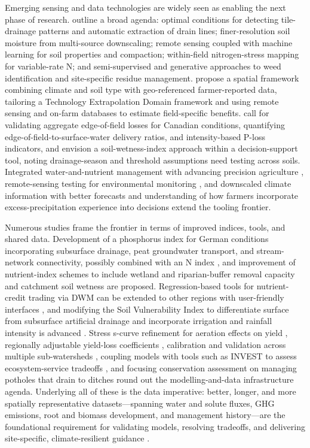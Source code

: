 Emerging sensing and data technologies are widely seen as enabling the next phase of research. \textcite{Khanal2020} outline a broad agenda: optimal conditions for detecting tile-drainage patterns and automatic extraction of drain lines; finer-resolution soil moisture from multi-source downscaling; remote sensing coupled with machine learning for soil properties and compaction; within-field nitrogen-stress mapping for variable-rate N; and semi-supervised and generative approaches to weed identification and site-specific residue management. \textcite{Cassman2025} propose a spatial framework combining climate and soil type with geo-referenced farmer-reported data, tailoring a Technology Extrapolation Domain framework and using remote sensing and on-farm databases to estimate field-specific benefits. \textcite{Reid2018} call for validating aggregate edge-of-field losses for Canadian conditions, quantifying edge-of-field-to-surface-water delivery ratios, and intensity-based P-loss indicators, and \textcite{Julien2023} envision a soil-wetness-index approach within a decision-support tool, noting drainage-season and threshold assumptions need testing across soils. Integrated water-and-nutrient management with advancing precision agriculture \parencite{Jung2024}, remote-sensing testing for environmental monitoring \parencite{Fontes2019}, and downscaled climate information with better forecasts and understanding of how farmers incorporate excess-precipitation experience into decisions \parencite{Morton2015} extend the tooling frontier.

Numerous studies frame the frontier in terms of improved indices, tools, and shared data. Development of a phosphorus index for German conditions incorporating subsurface drainage, peat groundwater transport, and stream-network connectivity, possibly combined with an N index \parencite{Buczko2007}, and improvement of nutrient-index schemes to include wetland and riparian-buffer removal capacity and catchment soil wetness \parencite{Pärn2012} are proposed. Regression-based tools for nutrient-credit trading via DWM can be extended to other regions with user-friendly interfaces \parencite{Negm2016}, and modifying the Soil Vulnerability Index to differentiate surface from subsurface artificial drainage and incorporate irrigation and rainfall intensity is advanced \parencite{Baffaut2020}. Stress s-curve refinement for aeration effects on yield \parencite{Wang2016}, regionally adjustable yield-loss coefficients \parencite{ROBINSON1992}, calibration and validation across multiple sub-watersheds \parencite{Singh2023}, coupling models with tools such as INVEST to assess ecosystem-service tradeoffs \parencite{McLellan2015}, and focusing conservation assessment on managing potholes that drain to ditches \parencite{Smith2008} round out the modelling-and-data infrastructure agenda. Underlying all of these is the data imperative: better, longer, and more spatially representative datasets---spanning water and solute fluxes, GHG emissions, root and biomass development, and management history---are the foundational requirement for validating models, resolving tradeoffs, and delivering site-specific, climate-resilient guidance \parencite{Ma2025,SKAGGS1994,Deng2011}.

